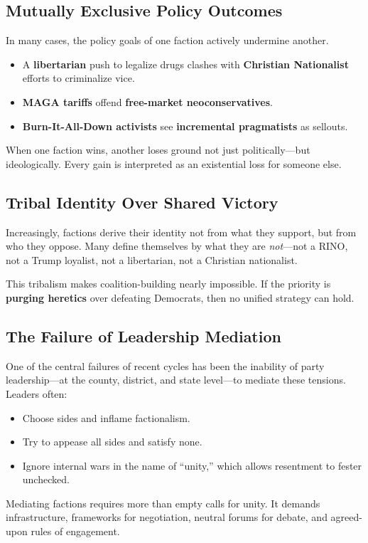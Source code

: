 \subsection{Mutually Exclusive Policy Outcomes}
In many cases, the policy goals of one faction actively undermine another.
\begin{itemize}
\item A \textbf{libertarian} push to legalize drugs clashes with \textbf{Christian Nationalist} efforts to criminalize vice.
\item \textbf{MAGA tariffs} offend \textbf{free-market neoconservatives}.
\item \textbf{Burn-It-All-Down activists} see \textbf{incremental pragmatists} as sellouts.
\end{itemize}

When one faction wins, another loses ground not just politically—but ideologically. Every gain is interpreted as an existential loss for someone else.

\subsection{Tribal Identity Over Shared Victory}
Increasingly, factions derive their identity not from what they support, but from who they oppose. Many define themselves by what they are \textit{not}—not a RINO, not a Trump loyalist, not a libertarian, not a Christian nationalist.

This tribalism makes coalition-building nearly impossible. If the priority is \textbf{purging heretics} over defeating Democrats, then no unified strategy can hold.

\subsection{The Failure of Leadership Mediation}
One of the central failures of recent cycles has been the inability of party leadership—at the county, district, and state level—to mediate these tensions. Leaders often:
\begin{itemize}
\item Choose sides and inflame factionalism.
\item Try to appease all sides and satisfy none.
\item Ignore internal wars in the name of “unity,” which allows resentment to fester unchecked.
\end{itemize}

Mediating factions requires more than empty calls for unity. It demands infrastructure, frameworks for negotiation, neutral forums for debate, and agreed-upon rules of engagement.

